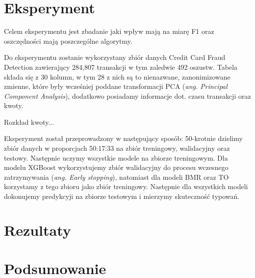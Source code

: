 \documentclass{book}
\begin{document}
\chapter{Eksperyment}

Celem eksperymentu jest zbadanie jaki wpływ mają na miarę F1 oraz oszczędności mają poszczególne algorytmy.

Do eksperymentu zostanie wykorzystany zbiór danych Credit Card Fraud Detection zawierający 284,807 transakcji w tym zaledwie 492 oszustw. Tabela składa się z 30 kolumn, w tym 28 z nich są to nienazwane, zanonimizowane zmienne, które były wcześniej poddane transformacji PCA (\textit{ang. Principal Component Analysis}), dodatkowo posiadamy informacje dot. czasu transakcji oraz kwoty. 

Rozkład kwoty...

Eksperyment został przeprowadzony w następujący sposób:
50-krotnie dzielimy zbiór danych w proporcjach 50:17:33 na zbiór treningowy, walidacyjny oraz testowy. Następnie uczymy wszystkie modele na zbiorze treningowym. Dla modelu XGBoost wykorzystujemy zbiór walidacyjny do procesu wczesnego zatrzymywania (\textit{ang. Early stopping}), natomiast dla modeli BMR oraz TO korzystamy z tego zbioru jako zbiór treningowy. Następnie dla wszystkich modeli dokonujemy predykcyji na zbiorze testowym i mierzymy skuteczność typowań.

\chapter{Rezultaty}

\chapter{Podsumowanie}
\end{document}

